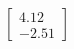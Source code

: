 \documentclass[preview]{standalone}
\begin{document}
\begin{align*}
\begin{bmatrix} 4.12 \\ -2.51 \end{bmatrix}
\end{align*}
\end{document}
